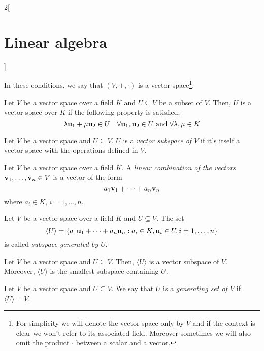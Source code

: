 \documentclass[../../../main.tex]{subfiles}
\begin{document}
\begin{multicols}{2}[\section{Linear algebra}]
\begin{definition}
\begin{enumerate}
    \end{enumerate}
    In these conditions, we say that $(V,+,\cdot)$ is a vector space\footnote{For simplicity we will denote the vector space only by $V$ and if the context is clear we won't refer to its associated field. Moreover sometimes we will also omit the product $\cdot$ between a scalar and a vector.}.
  \end{definition}
  \begin{definition}
    Let $V$ be a vector space over a field $K$ and $U\subseteq V$ be a subset of $V$. Then, $U$ is a vector space over $K$ if the following property is satisfied:
    $$\lambda \vb{u}_1+\mu \vb{u}_2\in U\quad\forall \vb{u}_1,\vb{u}_2\in U\text{ and }\forall\lambda,\mu\in K$$
  \end{definition}
  \begin{definition}
    Let $V$ be a vector space and $U\subseteq V$. $U$ is a \textit{vector subspace of $V$} if it's itself a vector space with the operations defined in $V$.
  \end{definition}
  \begin{definition}
    Let $V$ be a vector space over a field $K$. A \textit{linear combination of the vectors $\vb{v}_1,\ldots,\vb{v}_n\in V$} is a vector of the form $$a_1\vb{v}_1+\cdots+a_n\vb{v}_n$$ where $a_i\in K$, $i=1,\ldots,n$.
  \end{definition}
  \begin{definition}
    Let $V$ be a vector space over a field $K$ and $U\subseteq V$. The set $$\langle U\rangle=\{a_1\vb{u}_1+\cdots+a_n\vb{u}_n:a_i\in K,\vb{u}_i\in U,i=1,\ldots,n\}$$ is called \textit{subspace generated by $U$}.
  \end{definition}
  \begin{lemma}
    Let $V$ be a vector space and $U\subseteq V$. Then, $\langle U\rangle$ is a vector subspace of $V$. Moreover, $\langle U\rangle$ is the smallest subspace containing $U$.
  \end{lemma}
  \begin{definition}
    Let $V$ be a vector space and $U\subseteq V$. We say that $U$ is a \textit{generating set of $V$} if $\langle U\rangle=V$.
  \end{definition}

\end{multicols}
\end{document}
